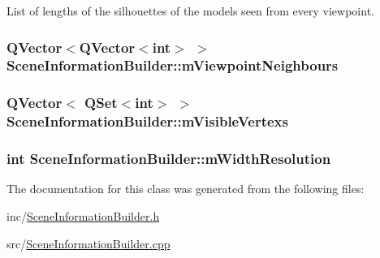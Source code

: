 List of lengths of the silhouettes of the models seen from every viewpoint. 

\hypertarget{class_scene_information_builder_a5a53e68d2231c33310973f0dd5a9e551}{
\subsubsection[{m\+Viewpoint\+Neighbours}]{\setlength{\rightskip}{0pt plus 5cm}Q\+Vector$<$Q\+Vector$<$int$>$ $>$ Scene\+Information\+Builder\+::m\+Viewpoint\+Neighbours\hspace{0.3cm}{\ttfamily [protected]}}}\label{class_scene_information_builder_a5a53e68d2231c33310973f0dd5a9e551}
\hypertarget{class_scene_information_builder_aed24f2301ec4a9297645d369ff5eaf60}{
\subsubsection[{m\+Visible\+Vertexs}]{\setlength{\rightskip}{0pt plus 5cm}Q\+Vector$<$ Q\+Set$<$int$>$ $>$ Scene\+Information\+Builder\+::m\+Visible\+Vertexs\hspace{0.3cm}{\ttfamily [protected]}}}\label{class_scene_information_builder_aed24f2301ec4a9297645d369ff5eaf60}
\hypertarget{class_scene_information_builder_a7406b48d40a381b62a49f02d60a5ed9d}{
\subsubsection[{m\+Width\+Resolution}]{\setlength{\rightskip}{0pt plus 5cm}int Scene\+Information\+Builder\+::m\+Width\+Resolution\hspace{0.3cm}{\ttfamily [protected]}}}\label{class_scene_information_builder_a7406b48d40a381b62a49f02d60a5ed9d}


The documentation for this class was generated from the following files\+:\begin{DoxyCompactItemize}
\item 
inc/\hyperlink{_scene_information_builder_8h}{Scene\+Information\+Builder.\+h}\item 
src/\hyperlink{_scene_information_builder_8cpp}{Scene\+Information\+Builder.\+cpp}\end{DoxyCompactItemize}
